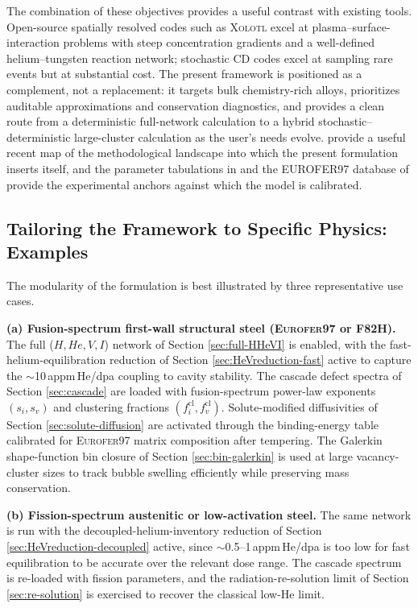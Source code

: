 \documentclass[sn-mathphys-ay,Numbered]{sn-jnl}
\begin{document}
The combination of these objectives provides a useful contrast with
existing tools. Open-source spatially resolved codes such as
\textsc{Xolotl} \citep{Faney2014,Xolotl2026} excel at
plasma--surface-interaction problems with steep concentration
gradients and a well-defined helium--tungsten reaction network;
stochastic CD codes \citep{MarianBulatov2011,Stewart2010} excel at
sampling rare events but at substantial cost. The present framework
is positioned as a complement, not a replacement: it targets bulk
chemistry-rich alloys, prioritizes auditable approximations and
conservation diagnostics, and provides a clean route from a
deterministic full-network calculation to a hybrid
stochastic--deterministic large-cluster calculation as the user's
needs evolve. \citet{Xiong2024} provide a useful recent map of the
methodological landscape into which the present formulation
inserts itself, and the parameter tabulations in \citet{Malerba2021a}
and the EUROFER97 database of \citet{Aktaa2020,Klimenkov2012} provide
the experimental anchors against which the model is calibrated.

\subsection*{Tailoring the Framework to Specific Physics: Examples}

The modularity of the formulation is best illustrated by three
representative use cases.

\textbf{(a) Fusion-spectrum first-wall structural steel
(\textsc{Eurofer97} or F82H).} The full
($H,He,V,I$) network of Section \ref{sec:full-HHeVI} is enabled, with
the fast-helium-equilibration reduction of
Section \ref{sec:HeVreduction-fast} active to capture the
$\sim$10\,appm\,He/dpa coupling to cavity stability. The cascade
defect spectra of Section \ref{sec:cascade} are loaded with
fusion-spectrum power-law exponents $(s_{i},s_{v})$ and clustering
fractions $(f_{i}^{\mathrm{cl}},f_{v}^{\mathrm{cl}})$. Solute-modified
diffusivities of Section \ref{sec:solute-diffusion} are activated
through the binding-energy table calibrated for \textsc{Eurofer97}
matrix composition after tempering. The Galerkin shape-function bin
closure of Section \ref{sec:bin-galerkin} is used at large vacancy-
cluster sizes to track bubble swelling efficiently while preserving
mass conservation.

\textbf{(b) Fission-spectrum austenitic or low-activation steel.}
The same network is run with the decoupled-helium-inventory reduction
of Section \ref{sec:HeVreduction-decoupled} active, since
$\sim$0.5--1\,appm\,He/dpa is too low for fast equilibration to be
accurate over the relevant dose range. The cascade spectrum is
re-loaded with fission parameters, and the radiation-re-solution
limit of Section \ref{sec:re-solution} is exercised to recover the
classical low-He limit.
\end{document}
